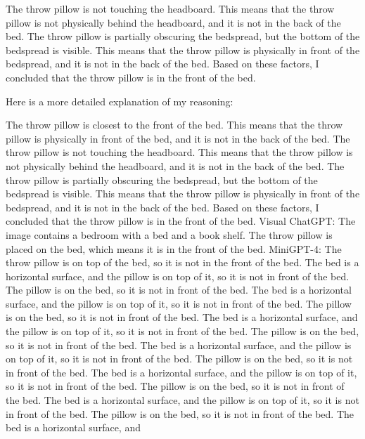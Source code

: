 \begin{enumerate}
        The throw pillow is not touching the headboard. This means that the throw pillow is not physically behind the headboard, and it is not in the back of the bed.
        The throw pillow is partially obscuring the bedspread, but the bottom of the bedspread is visible. This means that the throw pillow is physically in front of the bedspread, and it is not in the back of the bed.
        Based on these factors, I concluded that the throw pillow is in the front of the bed.
        
        Here is a more detailed explanation of my reasoning:
        
        The throw pillow is closest to the front of the bed. This means that the throw pillow is physically in front of the bed, and it is not in the back of the bed.
        The throw pillow is not touching the headboard. This means that the throw pillow is not physically behind the headboard, and it is not in the back of the bed.
        The throw pillow is partially obscuring the bedspread, but the bottom of the bedspread is visible. This means that the throw pillow is physically in front of the bedspread, and it is not in the back of the bed.
        Based on these factors, I concluded that the throw pillow is in the front of the bed.
        \subitem Visual ChatGPT: The image contains a bedroom with a bed and a book shelf. The throw pillow is placed on the bed, which means it is in the front of the bed.
        \subitem MiniGPT-4: The throw pillow is on top of the bed, so it is not in the front of the bed. The bed is a horizontal surface, and the pillow is on top of it, so it is not in front of the bed. The pillow is on the bed, so it is not in front of the bed. The bed is a horizontal surface, and the pillow is on top of it, so it is not in front of the bed. The pillow is on the bed, so it is not in front of the bed. The bed is a horizontal surface, and the pillow is on top of it, so it is not in front of the bed. The pillow is on the bed, so it is not in front of the bed. The bed is a horizontal surface, and the pillow is on top of it, so it is not in front of the bed. The pillow is on the bed, so it is not in front of the bed. The bed is a horizontal surface, and the pillow is on top of it, so it is not in front of the bed. The pillow is on the bed, so it is not in front of the bed. The bed is a horizontal surface, and the pillow is on top of it, so it is not in front of the bed. The pillow is on the bed, so it is not in front of the bed. The bed is a horizontal surface, and
    \end{enumerate}
